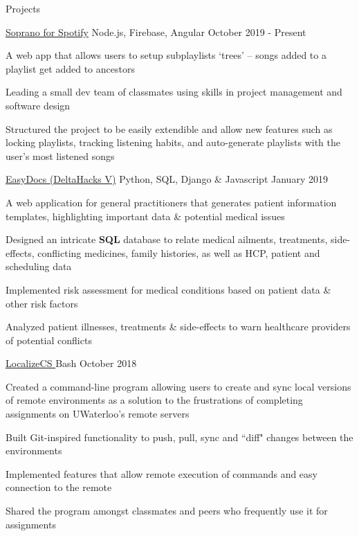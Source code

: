 \documentclass{resume} %
\begin{document}
\begin{rSection}{Projects}

    \begin{sideproject}
        {\href{https://walk-site.herokuapp.com/sub-playlists}{\faGlobe{} Soprano for Spotify}}
        {Node.js, Firebase, Angular}
        {October 2019 - Present}
        {
            \item A web app that allows users to setup subplaylists `trees' -- songs added to a playlist get added to ancestors
            \item Leading a small dev team of classmates using skills in project management and software design
            \item Structured the project to be easily extendible and allow new features such as locking playlists, tracking listening habits, and auto-generate playlists with the user's most listened songs
        }
    \end{sideproject}
    
    \vspace{1em}
    
    \begin{sideproject}
        {\href{https://github.com/wbhildeb/EasyDocs}{\faGithub{} EasyDocs (DeltaHacks V)}}
        {Python, SQL, Django \& Javascript}
        {January 2019}
        {
            \item A web application for general practitioners that generates patient information templates, highlighting important data \& potential medical issues
            \item Designed an intricate \textbf{SQL} database to relate medical ailments, treatments, side-effects, conflicting medicines, family histories, as well as HCP, patient and scheduling data
            \item Implemented risk assessment for medical conditions based on patient data \& other risk factors
            \item Analyzed patient illnesses, treatments \& side-effects to warn healthcare providers of potential conflicts
        }
    \end{sideproject}

    \vspace{1em}

    \begin{sideproject}
        {\href{https://github.com/wbhildeb/localize-cs}{\faGithub{} LocalizeCS }}
        {Bash}
        {October 2018}
        {
            \item Created a command-line program allowing users to create and sync local versions of remote environments as
            a solution to the frustrations of completing assignments on UWaterloo's remote servers
            \item Built Git-inspired functionality to push, pull, sync and ``diff" changes between the environments
            \item Implemented features that allow remote execution of commands and easy connection to the remote
            \item Shared the program amongst classmates and peers who frequently use it for assignments
        }
    \end{sideproject}
    

\end{rSection}
\end{document}
